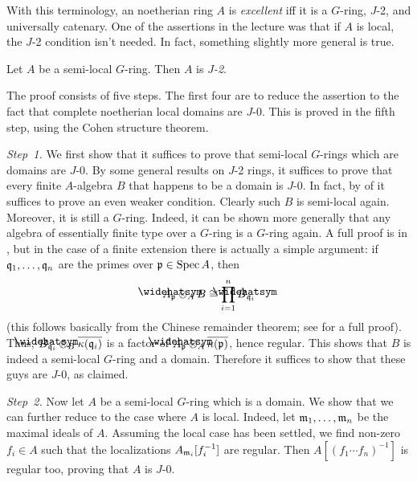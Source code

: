 With this terminology, an noetherian ring $A$ is \emph{excellent} iff it is a $G$-ring, $J$-2, and universally catenary. One of the assertions in the lecture was that if $A$ is local, the $J$-2 condition isn't needed. In fact, something slightly more general is true.
\begin{prop*}\label{prop*:GJ-2}
	Let $A$ be a semi-local $G$-ring. Then $A$ is \emph{$J$-2}.
\end{prop*}
\begin{proof*}
	The proof consists of five steps. The first four are to reduce the assertion to the fact that complete noetherian local domains are $J$-0. This is proved in the fifth step, using the Cohen structure theorem.
	
	\emph{Step~1.} We first show that it suffices to prove that semi-local $G$-rings which are domains are $J$-0. By some general results on $J$-2 rings, it suffices to prove that every finite $A$-algebra $B$ that happens to be a domain is $J$-0. In fact, by  of  it suffices to prove an even weaker condition. Clearly such $B$ is semi-local again. Moreover, it is still a $G$-ring. Indeed, it can be shown more generally that any algebra of essentially finite type over a $G$-ring is a $G$-ring again. A full proof is in , but in the case of a finite extension there is actually a simple argument: if $\mathfrak{q}_1,\dots,\mathfrak{q}_n$ are the primes over $\mathfrak{p}\in\operatorname{Spec} A$, then
	\begin{equation*}
	\roof{A}_\pp\otimes_AB\cong \prod_{i=1}^n\roof{B}_{\qq_i}
	\end{equation*}
	(this follows basically from the Chinese remainder theorem; see  for a full proof). Thus, $\roof{B}_{\qq_i}\otimes_B\ov{\kappa(\qq_i)}$ is a factor of $\roof{A}_\pp\otimes_A\ov{\kappa(\pp)}$, hence regular. This shows that $B$ is indeed a semi-local $G$-ring and a domain. Therefore it suffices to show that these guys are $J$-0, as claimed.
	
	\emph{Step~2.} Now let $A$ be a semi-local $G$-ring which is a domain. We show that we can further reduce to the case where $A$ is local. Indeed, let $\mathfrak{m}_1,\dotsc,\mathfrak{m}_n$ be the maximal ideals of $A$. Assuming the local case has been settled, we find non-zero $f_i\in A$ such that the localizations $A_{\mathfrak{m}_i}[f_i^{-1}]$ are regular. Then $A[(f_1\dotsm f_n)^{-1}]$ is regular too, proving that $A$ is $J$-0.
	

\end{proof*}
